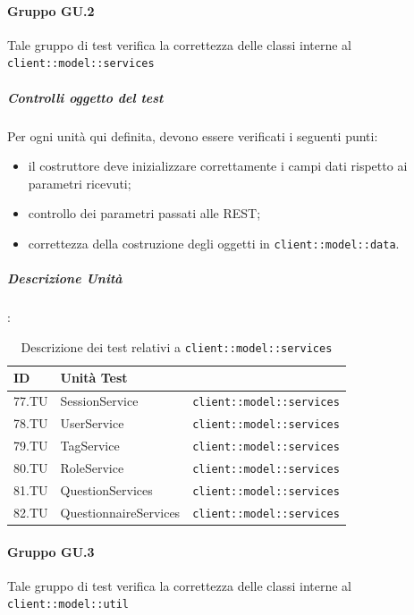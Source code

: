 \documentclass[12pt,a4paper]{article}
\begin{document}
\paragraph{Gruppo GU.2 }
Tale gruppo di test verifica la correttezza delle classi interne al  \texttt{client::model::services}

\subparagraph{Controlli oggetto del test}
Per ogni unità  qui definita, devono essere verificati i seguenti punti:

\begin{itemize}
	\item il costruttore deve inizializzare correttamente i campi dati rispetto ai parametri ricevuti;
	\item controllo dei parametri passati alle  REST;
	\item correttezza della costruzione degli oggetti in \texttt{client::model::data}.
\end{itemize}

\subparagraph{Descrizione Unità}:

\begin{table}[H]
	\begin{center}
		\begin{tabular}{p{} p{} p{}}
			\toprule
			\textbf{ID}   & \textbf{Unità Test}	& \textbf{\mgls{package}} \\ \midrule
			\midrule
			77.TU & SessionService & \texttt{client::model::services}\\ \midrule
			78.TU & UserService & \texttt{client::model::services}\\ \midrule
			79.TU & TagService & \texttt{client::model::services}\\ \midrule
			80.TU & RoleService & \texttt{client::model::services}\\ \midrule
			81.TU & QuestionServices & \texttt{client::model::services}\\ \midrule
			82.TU & QuestionnaireServices & \texttt{client::model::services}\\ \midrule
			\bottomrule
		\end{tabular}
	\end{center}
	\caption{Descrizione dei test relativi a \texttt{client::model::services}}
\end{table}

\paragraph{Gruppo GU.3}
Tale gruppo di test verifica la correttezza delle classi interne al  \texttt{client::model::util}
\end{document}

